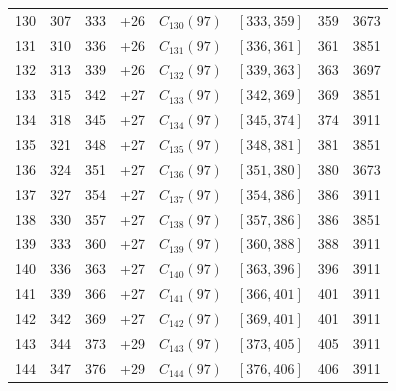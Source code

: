 \begin{longtable}{r r r r l c r r}
130 & 307 & 333 & +26 & $C_{130}(97)$ & $[333,359]$ & 359 & 3673\\
131 & 310 & 336 & +26 & $C_{131}(97)$ & $[336,361]$ & 361 & 3851\\
132 & 313 & 339 & +26 & $C_{132}(97)$ & $[339,363]$ & 363 & 3697\\
133 & 315 & 342 & +27 & $C_{133}(97)$ & $[342,369]$ & 369 & 3851\\
134 & 318 & 345 & +27 & $C_{134}(97)$ & $[345,374]$ & 374 & 3911\\
135 & 321 & 348 & +27 & $C_{135}(97)$ & $[348,381]$ & 381 & 3851\\
136 & 324 & 351 & +27 & $C_{136}(97)$ & $[351,380]$ & 380 & 3673\\
137 & 327 & 354 & +27 & $C_{137}(97)$ & $[354,386]$ & 386 & 3911\\
138 & 330 & 357 & +27 & $C_{138}(97)$ & $[357,386]$ & 386 & 3851\\
139 & 333 & 360 & +27 & $C_{139}(97)$ & $[360,388]$ & 388 & 3911\\
140 & 336 & 363 & +27 & $C_{140}(97)$ & $[363,396]$ & 396 & 3911\\
141 & 339 & 366 & +27 & $C_{141}(97)$ & $[366,401]$ & 401 & 3911\\
142 & 342 & 369 & +27 & $C_{142}(97)$ & $[369,401]$ & 401 & 3911\\
143 & 344 & 373 & +29 & $C_{143}(97)$ & $[373,405]$ & 405 & 3911\\
144 & 347 & 376 & +29 & $C_{144}(97)$ & $[376,406]$ & 406 & 3911\\
\end{longtable}

